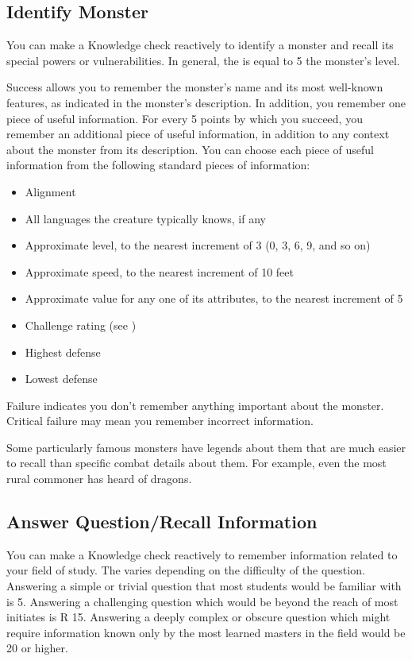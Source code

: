     \subsection{Identify Monster}
        You can make a Knowledge check reactively to identify a monster and recall its special powers or vulnerabilities.
        In general, the  is equal to 5 \add the monster's level.

        Success allows you to remember the monster's name and its most well-known features, as indicated in the monster's description.
        In addition, you remember one piece of useful information.
        For every 5 points by which you succeed, you remember an additional piece of useful information, in addition to any context about the monster from its description.
        You can choose each piece of useful information from the following standard pieces of information:
        \begin{itemize}
            \item Alignment
            \item All languages the creature typically knows, if any
            \item Approximate level, to the nearest increment of 3 (0, 3, 6, 9, and so on)
            \item Approximate speed, to the nearest increment of 10 feet
            \item Approximate value for any one of its attributes, to the nearest increment of 5
            \item Challenge rating (see )
            \item Highest defense
            \item Lowest defense
        \end{itemize}

        Failure indicates you don't remember anything important about the monster.
        Critical failure may mean you remember incorrect information.

        Some particularly famous monsters have legends about them that are much easier to recall than specific combat details about them.
        For example, even the most rural commoner has heard of dragons.

    \subsection{Answer Question/Recall Information}
        You can make a Knowledge check reactively to remember information related to your field of study. The  varies depending on the difficulty of the question. Answering a simple or trivial question that most students would be familiar with is  5. Answering a challenging question which would be beyond the reach of most initiates is R 15. Answering a deeply complex or obscure question which might require information known only by the most learned masters in the field would be  20 or higher.

